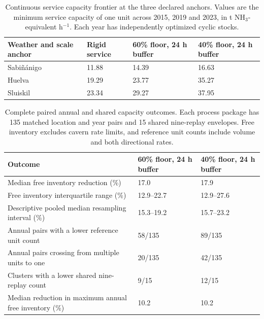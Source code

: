 \begin{table}[H]
\caption{Continuous service capacity frontier at the three declared anchors. Values are the minimum service capacity of one unit across 2015, 2019 and 2023, in t NH$_3$-equivalent h$^{-1}$. Each year has independently optimized cyclic stocks.\label{tab:frontier}}
\begin{tabularx}{\textwidth}{@{}J{1.40} K{0.8667} K{0.8667} K{0.8666}@{}}
\toprule
\textbf{Weather and scale anchor} & \textbf{Rigid service} & \textbf{60\% floor, 24 h buffer} & \textbf{40\% floor, 24 h buffer}\\
\midrule
Sabi\~n\'anigo & 11.88 & 14.39 & 16.63\\
Huelva & 19.29 & 23.77 & 35.27\\
Sluiskil & 23.34 & 29.27 & 37.95\\
\bottomrule
\end{tabularx}
\end{table}

\begin{table}[H]
\caption{Complete paired annual and shared capacity outcomes. Each process package has 135 matched location and year pairs and 15 shared nine-replay envelopes. Free inventory excludes cavern rate limits, and reference unit counts include volume and both directional rates.\label{tab:paired}}
\begin{tabularx}{\textwidth}{@{}J{1.65} K{0.675} K{0.675}@{}}
\toprule
\textbf{Outcome} & \textbf{60\% floor, 24 h buffer} & \textbf{40\% floor, 24 h buffer}\\
\midrule
Median free inventory reduction (\%) & 17.0 & 17.9\\
Free inventory interquartile range (\%) & 12.9--22.7 & 12.9--27.6\\
Descriptive pooled median resampling interval (\%) & 15.3--19.2 & 15.7--23.2\\
Annual pairs with a lower reference unit count & 58/135 & 89/135\\
Annual pairs crossing from multiple units to one & 20/135 & 42/135\\
Clusters with a lower shared nine-replay count & 9/15 & 12/15\\
Median reduction in maximum annual free inventory (\%) & 10.2 & 10.2\\
\bottomrule
\end{tabularx}
\end{table}

